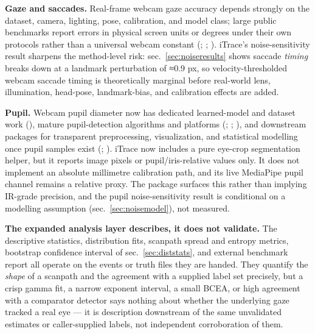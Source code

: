 \documentclass[
]{article}
\begin{document}
\textbf{Gaze and saccades.} Real-frame webcam gaze accuracy depends
strongly on the dataset, camera, lighting, pose, calibration, and model
class; large public benchmarks report errors in physical screen units or
degrees under their own protocols rather than a universal webcam
constant (;
;
). iTrace's
noise-sensitivity result sharpens the method-level risk:
sec.~\ref{sec:noiseresults} shows saccade \emph{timing} breaks down at a
landmark perturbation of ≈0.9 px, so velocity-thresholded webcam saccade
timing is theoretically marginal before real-world lens, illumination,
head-pose, landmark-bias, and calibration effects are added.

\textbf{Pupil.} Webcam pupil diameter now has dedicated learned-model
and dataset work (),
mature pupil-detection algorithms and platforms
(;
;
), and downstream
packages for transparent preprocessing, visualization, and statistical
modelling once pupil samples exist (; ). iTrace now includes a pure eye-crop segmentation helper, but it
reports image pixels or pupil/iris-relative values only. It does not
implement an absolute millimetre calibration path, and its live
MediaPipe pupil channel remains a relative proxy. The package surfaces
this rather than implying IR-grade precision, and the pupil
noise-sensitivity result is conditional on a modelling assumption
(sec.~\ref{sec:noisemodel}), not measured.

\textbf{The expanded analysis layer describes, it does not validate.}
The descriptive statistics, distribution fits, scanpath spread and
entropy metrics, bootstrap confidence interval of
sec.~\ref{sec:diststats}, and external benchmark report all operate on
the events or truth files they are handed. They quantify the
\emph{shape} of a scanpath and the agreement with a supplied label set
precisely, but a crisp gamma fit, a narrow exponent interval, a small
BCEA, or high agreement with a comparator detector says nothing about
whether the underlying gaze tracked a real eye --- it is description
downstream of the same unvalidated estimates or caller-supplied labels,
not independent corroboration of them.
\end{document}
